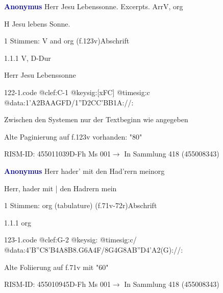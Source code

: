 \documentclass[twocolumn]{book}
\begin{document}
\par \vspace{7pt} \textcolor{darkblue}{\textbf{Anonymus  }}\hfillplus{\textbf{[122]}}\newline Herr Jesu Lebenssonne. Excerpts. Arr\newline V, org
\par \begin{itshape} H Jesu lebens Sonne.\end{itshape} 
\par \textcolor{darkblue}{}  1 Stimmen: V and org  (f.123v)\newline Abschrift
\par 1.1.1  V, D-Dur\newline \begin{footnotesize} Herr Jesu Lebenssonne \end{footnotesize}  
\begin{filecontents*}{122-1.code}
@clef:C-1
@keysig:[xFC]
@timesig:c
@data:1'A2BAAGFD/1''D2CC'BB1A://:
\end{filecontents*}
\newline
%
\par Zwischen den Systemen nur der Textbeginn wie angegeben
\par Alte Paginierung auf f.123v vorhanden: "80"
\par RISM-ID: 455011039\newline D-Fh  Ms 001\newline $\rightarrow$ In Sammlung 418 (455008343)
      
\par \vspace{7pt} \textcolor{darkblue}{\textbf{Anonymus  }}\hfillplus{\textbf{[123]}}\newline Herr hader' mit den Had'rern mein\newline org
\par \begin{itshape}[f.71v, at left:] Herr, hader mit | den Hadrern mein\end{itshape} 
\par \textcolor{darkblue}{}  1 Stimmen: org (tabulature)  (f.71v-72r)\newline Abschrift
\par 1.1.1  org  
\begin{filecontents*}{123-1.code}
@clef:G-2
@keysig:
@timesig:c/
@data:4'B''C8'B4A8B8.G6A4F/8G4G8A{B''D}4'A2(G)://:
\end{filecontents*}
\newline
%
\par Alte Foliierung auf f.71v mit "60"
\par RISM-ID: 455010945\newline D-Fh  Ms 001\newline $\rightarrow$ In Sammlung 418 (455008343)
      
\end{document}
